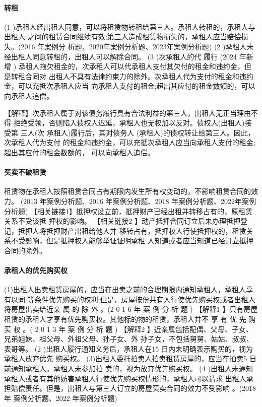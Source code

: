 \documentclass[UTF8,12pt]{ctexart}
\numberwithin{equation}{section} %
\numberwithin{figure}{section}
\numberwithin{table}{section}
\begin{document}
	\paragraph{转租}
	(1 )承租人经出租人同意，可以将租赁物转租给第三人。承租人转租的，承租人与出租人 之间的租赁合同继续有效;第三人造成租赁物损失的，承租人应当赔偿损失。(2016 年案例分 析题、2020年案例分析题、2023年案例分析题)
	(2 )承租人未经出租人同意转租的，出租人可以解除合同。 (3 )次承租人的代 履行 (2024 年新增 )
	承租人拖欠租金的，次承租人可以代承租人支付其欠付的租金和违约金，但是转租合同对 出租人不具有法律约束力的除外。次承租人代为支付的租金和违约金，可以充抵次承租人应当 向承租人支付的租金;超出其应付的租金数额的，可以向承租人追偿。
	
	【解释】次承租人属于对该债务履行具有合法利益的第三人，出租人无正当理由不得 拒绝受领，否则陷入债权人迟延，承租人也无权加以反对。债权人(出租人)接受第 三人(次 承租人)履行后，其对债务人 (承租人)的债权转让给第三人。因此，次承租人代为支付 的租金和违约金，可以充抵次承租人应当向承租人支付的租金;超出其应付的租金数额的， 可以向承租人追偿。
	
	\paragraph{买卖不破租赁} 租赁物在承租人按照租赁合同占有期限内发生所有权变动的，不影响租赁合同的效力。 (2013 年案例分析题、2016 年案例分析题、2018 年案例分析题、2022年案例分析题)
	【相关链接1】抵押权设立前，抵押财产已经出租并转移占有的，原租赁关系不受该抵 押权的影响。
	【相关链接2 】动产抵押合同订立后未办理抵押登记，抵押人将抵押财产出租给他人并 移转占有，抵押权人行使抵押权的，租赁关系不受影响，但是抵押权人能够举证证明承租 人知道或者应当知道已经订立抵押合同的除外。
	
	\paragraph{承租人的优先购买权} 
	(1)出租人出卖租赁房屋的，应当在出卖之前的合理期限内通知承租人，承租人享有以同 等条件优先购买的权利;但是，房屋按份共有人行使优先购买权或者出租人将房屋出卖给近亲 属 的 除 外 。(2 0 1 6 年 案 例 分 析 题 )
	【解释1 】只有房屋租赁的承租人才享有优先购买权。其他标的物的租赁，承租人并不 享 有 优 先 购 买 权 。( 2 0 1 3 年 案 例 分 析 题 )
	【解释2 】近亲属包括配偶、父母、子女、兄弟姐妹、祖父母、外祖父母、孙子女、外 孙子女，不包括舅舅、姑姑、叔叔、表哥等。
	(2 )出租人履行通知义务后，承租人在15 日内未明确表示购买的，视为承租人放弃优先 购买权。
	(3)出租人委托拍卖人拍卖租赁房屋的，应当在拍卖5 日前通知承租人。承租人未参加拍 卖的，视为放弃优先购买权。
	(4 )出租人未通知承租人或者有其他妨害承租人行使优先购买权情形的，承租人可以请求 出租人承担赔偿责任。但是，出租人与第三人订立的房屋买卖合同的效力不受影响 。(2018年 案例分析题、2022 年案例分析题)
	
\end{document}
